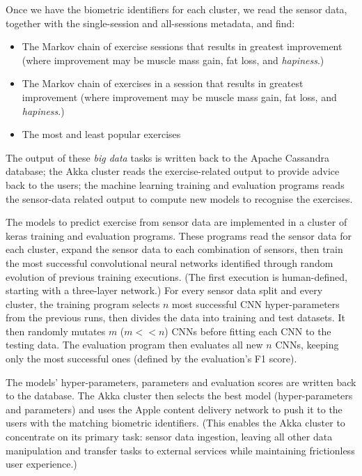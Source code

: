\documentclass[a4paper, 10 pt, conference]{IEEEtran}
\begin{document}
Once we have the biometric identifiers for each cluster, we read the sensor data, together with the single-session and all-sessions metadata, and find:

\begin{itemize}
\item The Markov chain of exercise sessions that results in greatest improvement (where improvement may be muscle mass gain, fat loss, and \emph{hapiness}.)
\item The Markov chain of exercises in a session that results in greatest improvement (where improvement may be muscle mass gain, fat loss, and \emph{hapiness}.)
\item The most and least popular exercises
\end{itemize}

The output of these \emph{big data} tasks is written back to the Apache Cassandra database; the Akka cluster reads the exercise-related output to provide advice back to the users; the machine learning training and evaluation programs reads the sensor-data related output to compute new models to recognise the exercises.

The models to predict exercise from sensor data are implemented in a cluster of keras \cite{keras} training and evaluation programs. These programs read the sensor data for each cluster, expand the sensor data to each combination of sensors, then train the most successful convolutional neural networks identified through random evolution of previous training executions. (The first execution is human-defined, starting with a three-layer network.) For every sensor data split and every cluster, the training program selects $n$ most successful CNN hyper-parameters from the previous runs, then divides the data into training and test datasets. It then randomly mutates $m$ ($m << n$) CNNs before fitting each CNN to the testing data. The evaluation program then evaluates all new $n$ CNNs, keeping only the most successful ones (defined by the evaluation's F1 score).

The models' hyper-parameters, parameters and evaluation scores are written back to the database. The Akka cluster then selects the best model (hyper-parameters and parameters) and uses the Apple content delivery network to push it to the users with the matching biometric identifiers. (This enables the Akka cluster to concentrate on its primary task: sensor data ingestion, leaving all other data manipulation and transfer tasks to external services while maintaining frictionless user experience.)
\end{document}
